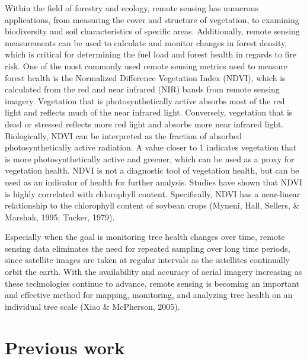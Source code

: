 \documentclass[12pt,twoside]{reedthesis}
\begin{document}
Within the field of forestry and ecology, remote sensing has numerous applications, from measuring the cover and structure of vegetation, to examining biodiversity and soil characteristics of specific areas. Additionally, remote sensing measurements can be used to calculate and monitor changes in forest density, which is critical for determining the fuel load and forest health in regards to fire risk. One of the most commonly used remote sensing metrics used to measure forest health is the Normalized Difference Vegetation Index (NDVI), which is calculated from the red and near infrared (NIR) bands from remote sensing imagery. Vegetation that is photosynthetically active absorbs most of the red light and reflects much of the near infrared light. Conversely, vegetation that is dead or stressed reflects more red light and absorbs more near infrared light. Biologically, NDVI can be interpreted as the fraction of absorbed photosynthetically active radiation. A value closer to 1 indicates vegetation that is more photosynthetically active and greener, which can be used as a proxy for vegetation health. NDVI is not a diagnostic tool of vegetation health, but can be used as an indicator of health for further analysis. Studies have shown that NDVI is highly correlated with chlorophyll content. Specifically, NDVI has a near-linear relationship to the chlorophyll content of soybean crops (Myneni, Hall, Sellers, \& Marshak, 1995; Tucker, 1979).

Especially when the goal is monitoring tree health changes over time, remote sensing data eliminates the need for repeated sampling over long time periods, since satellite images are taken at regular intervals as the satellites continually orbit the earth. With the availability and accuracy of aerial imagery increasing as these technologies continue to advance, remote sensing is becoming an important and effective method for mapping, monitoring, and analyzing tree health on an individual tree scale (Xiao \& McPherson, 2005).

\hypertarget{previous-work}{%
\section{Previous work}\label{previous-work}}
\end{document}

